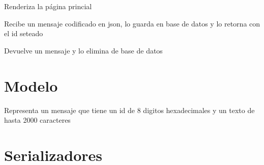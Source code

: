 \documentclass[letterpaper,10pt,spanish]{sphinxmanual}
\begin{document}
\begin{fulllineitems}
\label{\detokenize{modules/views:apirestv1.views.index}}
Renderiza la página princial

\end{fulllineitems}


\begin{fulllineitems}
\label{\detokenize{modules/views:apirestv1.views.post_message}}
Recibe un mensaje codificado en json, lo guarda en base de datos
y lo retorna con el id seteado

\end{fulllineitems}


\begin{fulllineitems}
\label{\detokenize{modules/views:apirestv1.views.get_message}}
Devuelve un mensaje y lo elimina de base de datos

\end{fulllineitems}



\chapter{Modelo}
\label{\detokenize{modules/models:module-apirestv1.models}}\label{\detokenize{modules/models::doc}}\label{\detokenize{modules/models:modelo}}

\begin{fulllineitems}
\label{\detokenize{modules/models:apirestv1.models.Message}}
Representa un mensaje que tiene un id de 8 digitos hexadecimales
y un texto de hasta 2000 caracteres

\end{fulllineitems}



\chapter{Serializadores}
\label{\detokenize{modules/serializers:module-apirestv1.serializers}}\label{\detokenize{modules/serializers::doc}}\label{\detokenize{modules/serializers:serializadores}}
\end{document}
